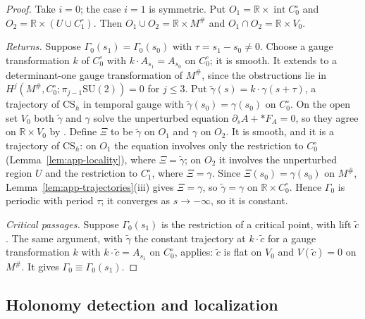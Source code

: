 \documentclass[11pt]{amsart}
\theoremstyle{definition}
\theoremstyle{remark}
\theoremstyle{plain}
\numberwithin{equation}{section}
\newcommand{\RR}{\mathbb{R}}
\newcommand{\SU}{\mathrm{SU}}
\begin{document}
\begin{proof}
Take $i=0$; the case $i=1$ is symmetric. Put $O_1=\RR\times\operatorname{int}C_0^\circ$ and
$O_2=\RR\times(U\cup C_1^\circ)$. Then $O_1\cup O_2=\RR\times M^\#$ and
$O_1\cap O_2=\RR\times V_0$.

\emph{Returns.} Suppose $\Gamma_0(s_1)=\Gamma_0(s_0)$ with $\tau=s_1-s_0\ne0$. Choose a gauge
transformation $k$ of $C_0^\circ$ with $k\cdot A_{s_1}=A_{s_0}$ on $C_0^\circ$; it is smooth. It
extends to a determinant-one gauge transformation of $M^\#$, since the obstructions lie in
$H^j(M^\#,C_0^\circ;\pi_{j-1}\SU(2))=0$ for $j\le3$. Put $\tilde\gamma(s)=k\cdot\gamma(s+\tau)$, a
trajectory of $\mathrm{CS}_h$ in temporal gauge with $\tilde\gamma(s_0)=\gamma(s_0)$ on $C_0^\circ$.
On the open set $V_0$ both $\tilde\gamma$ and $\gamma$ solve the unperturbed equation
$\partial_sA+*F_A=0$, so they agree on $\RR\times V_0$ by \cite[Lemma~8.7(i)]{SW-lagrangian}.
Define $\Xi$ to be $\tilde\gamma$ on $O_1$ and $\gamma$ on $O_2$. It is smooth, and it is a
trajectory of $\mathrm{CS}_h$: on $O_1$ the equation involves only the restriction to $C_0^\circ$
(Lemma~\ref{lem:app-locality}), where $\Xi=\tilde\gamma$; on $O_2$ it involves the unperturbed
region $U$ and the restriction to $C_1^\circ$, where $\Xi=\gamma$. Since $\Xi(s_0)=\gamma(s_0)$ on
$M^\#$, Lemma~\ref{lem:app-trajectories}(iii) gives $\Xi=\gamma$, so $\tilde\gamma=\gamma$ on
$\RR\times C_0^\circ$. Hence $\Gamma_0$ is periodic with period $\tau$; it converges as
$s\to-\infty$, so it is constant.

\emph{Critical passages.} Suppose $\Gamma_0(s_1)$ is the restriction of a critical point, with
lift $\tilde c$. The same argument, with $\tilde\gamma$ the constant trajectory at $k\cdot\tilde c$
for a gauge transformation $k$ with $k\cdot\tilde c=A_{s_1}$ on $C_0^\circ$, applies: $\tilde c$ is
flat on $V_0$ and $V(\tilde c)=0$ on $M^\#$. It gives $\Gamma_0\equiv\Gamma_0(s_1)$.
\end{proof}

\subsection{Holonomy detection and localization}
\end{document}
